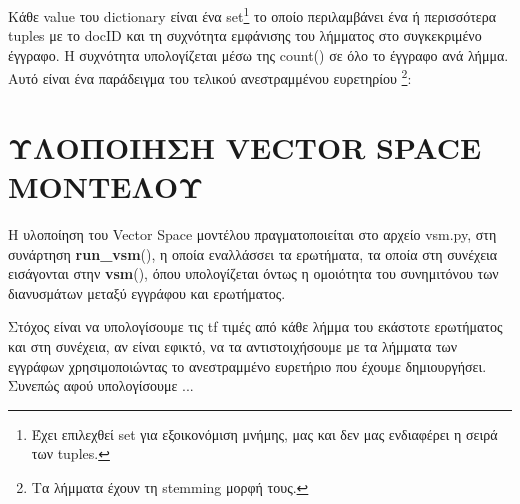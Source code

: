 \documentclass[12pt]{report}
\begin{document}
            Κάθε value του dictionary είναι ένα set\footnote{Έχει επιλεχθεί set για εξοικονόμιση μνήμης, μας και δεν μας ενδιαφέρει η σειρά των tuples.} το οποίο περιλαμβάνει ένα ή περισσότερα tuples
            με το {\fontCode\small docID} και τη συχνότητα εμφάνισης του λήμματος στο συγκεκριμένο έγγραφο.
            Η συχνότητα υπολογίζεται μέσω της {\fontCode\small count()} σε όλο το έγγραφο ανά λήμμα. Αυτό είναι ένα παράδειγμα του τελικού ανεστραμμένου ευρετηρίου \footnote{Τα λήμματα έχουν τη stemming μορφή τους.}:


                \begin{graycomment} \centering
                    {\fontCode\scriptsize inverted\_index = \{\(\ldots\) 'coronari': {('01217', 2), ('00779', 1), ('00164', 1)}, \\ 'graft': {('00164', 1)}, 'mobil': {('00673', 2), 'strain': {('00179', 7), \(\ldots\)\} }
                \end{graycomment}

        \section{ΥΛΟΠΟΙΗΣΗ VECTOR SPACE ΜΟΝΤΕΛΟΥ}

            Η υλοποίηση του Vector Space μοντέλου πραγματοποιείται στο αρχείο {\fontCode\small vsm.py}, στη συνάρτηση {\fontCode\small \textbf{run\_vsm}()},
            η οποία εναλλάσσει τα ερωτήματα, τα οποία στη συνέχεια εισάγονται στην {\fontCode\small \textbf{vsm}()}, όπου υπολογίζεται όντως η ομοιότητα του συνημιτόνου των διανυσμάτων μεταξύ εγγράφου και ερωτήματος.

            Στόχος είναι να υπολογίσουμε τις tf τιμές από κάθε λήμμα του εκάστοτε ερωτήματος και στη συνέχεια, αν είναι εφικτό, να τα αντιστοιχήσουμε με τα λήμματα των εγγράφων χρησιμοποιώντας το ανεστραμμένο ευρετήριο που έχουμε δημιουργήσει.
            Συνεπώς αφού υπολογίσουμε ...
\end{document}
